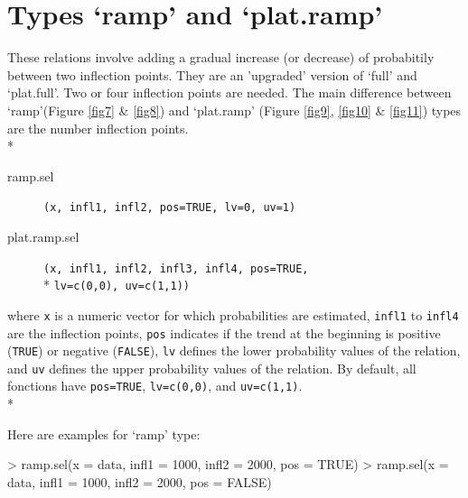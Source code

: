 \documentclass[letterpaper, 12pt]{article}
\begin{document}

\newpage

\section{Types `ramp' and `plat.ramp'}
\noindent These relations involve adding a gradual increase (or decrease) of probabitily between two inflection points. 
They are an 'upgraded' version of `full' and `plat.full'. Two or four inflection points are needed. 
The main difference between `ramp'(Figure \ref{fig7} \& \ref{fig8}) and `plat.ramp' (Figure \ref{fig9}, \ref{fig10} \& \ref{fig11}) 
types are the number inflection points.\\*
			
\begin{description}
\item[ramp.sel]\verb#(x, infl1, infl2, pos=TRUE, lv=0, uv=1)#
\item[plat.ramp.sel]\verb#(x, infl1, infl2, infl3, infl4, pos=TRUE,# \\* \verb#lv=c(0,0), uv=c(1,1))#
\end{description}
where \verb#x# is a numeric vector for which probabilities are estimated, \verb#infl1# to \verb#infl4# are the inflection points,  \verb#pos# indicates if the trend at the beginning is positive  (\verb#TRUE#) or negative (\verb#FALSE#), \verb#lv# defines the 
lower probability values of the relation, and \verb#uv# defines the upper probability values of the relation. By default, 
all fonctions have \verb#pos=TRUE#, \verb#lv=c(0,0)#, and \verb#uv=c(1,1)#.\\*

Here are examples for `ramp' type:
\begin{Schunk}
\begin{Sinput}
> ramp.sel(x = data, infl1 = 1000, infl2 = 2000, pos = TRUE)
> ramp.sel(x = data, infl1 = 1000, infl2 = 2000, pos = FALSE)
\end{Sinput}
\end{Schunk}
\end{document}
